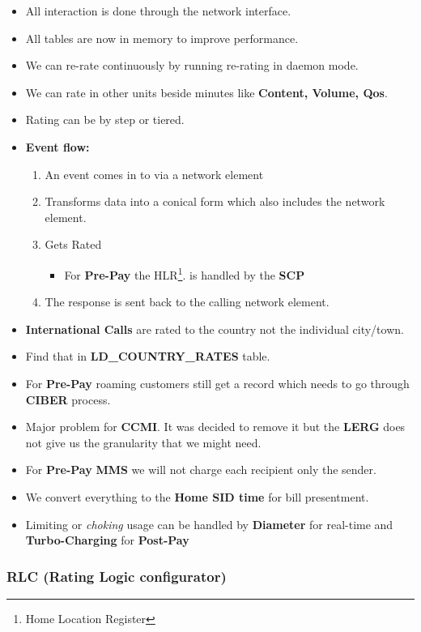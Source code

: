 \documentclass[12pt,twoside]{article}
\begin{document}
\begin{itemize}
\item All interaction is done through the network interface.
\item All tables are now in memory to improve performance.
\item We can re-rate continuously by running re-rating in daemon mode.
\item We can rate in other units beside minutes like \textbf{Content, Volume, Qos}.
\item Rating can be by step or tiered.
\item \textbf{Event flow:}
\begin{enumerate}
\item An event comes in to via a network element
\item Transforms data into a conical form which also includes the network element.
\item Gets Rated
\begin{itemize}
\item For \textbf{Pre-Pay} the HLR\footnote{Home Location Register
 }. is handled by the \textbf{SCP}
\end{itemize}
\item The response is sent back to the calling network element.
\end{enumerate}
\item \textbf{International Calls} are rated to the country not the individual city/town.
\item Find that in \textbf{LD\_COUNTRY\_RATES} table.
\item For \textbf{Pre-Pay} roaming customers still get a record which needs to go through \textbf{CIBER} process.
\item Major problem for \textbf{CCMI}. It was decided to remove it but the \textbf{LERG} does not give us the granularity that we might need.
\item For \textbf{Pre-Pay} \textbf{MMS} we will not charge each recipient only the sender.
\item We convert everything to the \textbf{Home SID time} for bill presentment.
\item Limiting or \emph{choking} usage can be handled by \textbf{Diameter} for real-time and \textbf{Turbo-Charging} for \textbf{Post-Pay}
\end{itemize}
\subsubsection{RLC (Rating Logic configurator)}
\label{sec-3-2-1}
\end{document}
